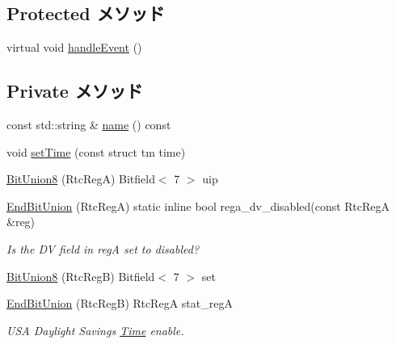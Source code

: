 \subsection*{Protected メソッド}
\begin{DoxyCompactItemize}
\item 
virtual void \hyperlink{classMC146818_a30dfd044b822d58a6ff7335f815af8b1}{handleEvent} ()
\end{DoxyCompactItemize}
\subsection*{Private メソッド}
\begin{DoxyCompactItemize}
\item 
const std::string \& \hyperlink{classMC146818_a324e8c54c4c5161913681a1a52fef959}{name} () const 
\item 
void \hyperlink{classMC146818_a2d06df539c4db142b96a5848870ebd28}{setTime} (const struct tm time)
\item 
\hyperlink{classMC146818_a374ca70b66d8c7697052fbf0d917c31c}{BitUnion8} (RtcRegA) Bitfield$<$ 7 $>$ uip
\item 
\hyperlink{classMC146818_ae44f0fd1a86e3e746e818f5817c33e18}{EndBitUnion} (RtcRegA) static inline bool rega\_\-dv\_\-disabled(const RtcRegA \&reg)
\begin{DoxyCompactList}\small\item\em Is the DV field in regA set to disabled? \item\end{DoxyCompactList}\item 
\hyperlink{classMC146818_ae9e7ebb8d4dc55d588540f5b369c2bbd}{BitUnion8} (RtcRegB) Bitfield$<$ 7 $>$ set
\item 
\hyperlink{classMC146818_a7efacf2a80b3519649bf9901abe5eaae}{EndBitUnion} (RtcRegB) RtcRegA stat\_\-regA
\begin{DoxyCompactList}\small\item\em USA Daylight Savings \hyperlink{classTime}{Time} enable. \item\end{DoxyCompactList}\end{DoxyCompactItemize}
